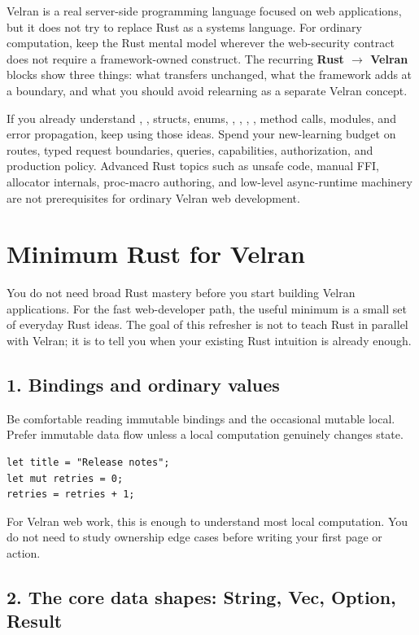 Velran is a real server-side programming language focused on web applications, but it does not try to replace Rust as a systems language. For ordinary computation, keep the Rust mental model wherever the web-security contract does not require a framework-owned construct. The recurring \textbf{Rust $\rightarrow$ Velran} blocks show three things: what transfers unchanged, what the framework adds at a boundary, and what you should avoid relearning as a separate Velran concept.

If you already understand , , structs, enums, , , , , method calls, modules, and  error propagation, keep using those ideas. Spend your new-learning budget on routes, typed request boundaries, queries, capabilities, authorization, and production policy. Advanced Rust topics such as unsafe code, manual FFI, allocator internals, proc-macro authoring, and low-level async-runtime machinery are not prerequisites for ordinary Velran web development.


\section*{Minimum Rust for Velran}

You do not need broad Rust mastery before you start building Velran applications. For the fast web-developer path, the useful minimum is a small set of everyday Rust ideas. The goal of this refresher is not to teach Rust in parallel with Velran; it is to tell you when your existing Rust intuition is already enough.

\subsection*{1. Bindings and ordinary values}

Be comfortable reading immutable bindings and the occasional mutable local. Prefer immutable data flow unless a local computation genuinely changes state.

\begin{lstlisting}[language=Velran]
let title = "Release notes";
let mut retries = 0;
retries = retries + 1;
\end{lstlisting}

For Velran web work, this is enough to understand most local computation. You do not need to study ownership edge cases before writing your first page or action.

\subsection*{2. The core data shapes: String, Vec, Option, Result}

